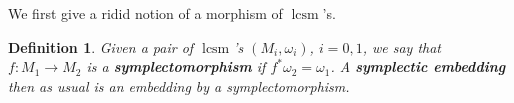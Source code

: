 \documentclass{amsart}
\numberwithin{equation}{section}
\newtheorem{theorem}[equation]{Theorem}
\newtheorem{definition}[equation]{Definition}
\theoremstyle{definition}
\theoremstyle{remark}
\DeclareMathOperator{\lcs}{lcs}
\DeclareMathOperator{\lcsm}{lcsm}
\begin{document}
We first give a ridid notion of a morphism of $\lcsm$'s. 
\begin{definition}
   Given a pair of $\lcsm$'s $(M _{i}, \omega _{i} )$, $i=0,1$, we say that $f: M _{1} \to M _{2}  $ is a \textbf{\emph{symplectomorphism}} if 
   $f^{*} \omega _{2} = \omega _{1}$. A \textbf{\emph{symplectic embedding}} then as usual is an embedding by a symplectomorphism.
\end{definition}
\end{document}
